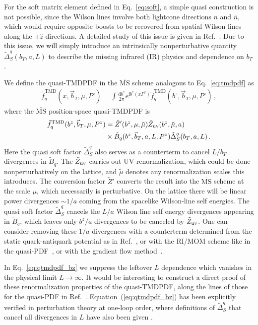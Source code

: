 \documentclass[prd,aps,twocolumn,bibnotes,nofootinbib,preprintnumbers,floatfix]{revtex4-1}
\DeclareRobustCommand{\eq}[1]{Eq.~\eqref{eq:#1}}
\DeclareRobustCommand{\mycite}[1]{Ref.~\cite{#1}}
\newcommand{\df}{\mathrm{d}}
\newcommand{\img}{\mathrm{i}}
\newcommand{\nn}{\nonumber}
\newcommand{\bn}{{\bar{n}}}
\newcommand{\bt}{\vec b_T}
\newcommand{\MS}{\overline{\mathrm{MS}}}
\newcommand\TMD{\mathrm{TMD}}
\begin{document}
For the soft matrix element defined in \eq{soft}, a simple quasi construction is not possible,
since the Wilson lines involve both lightcone directions $n$ and $\bn$, which would require opposite boosts to be recovered from spatial Wilson lines along the $\pm \hat z$ directions.
A detailed study of this issue is given in \mycite{Ebert:2019okf}.
Due to this issue, we will simply introduce an intrinsically nonperturbative quantity $\tilde\Delta_S^q(b_T,a,L)$ to describe the missing infrared (IR) physics and dependence on $b_T$.


We define the quasi-TMDPDF in the $\MS$ scheme analogous to \eq{tmdpdf} as
\begin{align} \label{eq:qtmdpdf}
 \tilde f_{q}^\TMD(x, \bt,\mu,P^z) = \!\int\!\frac{\df b^z}{2\pi} e^{\img b^z (x P^z)} \tilde f_{q}^\TMD(b^z, \bt,\mu,P^z)
\,, \end{align}
where the $\MS$ position-space quasi-TMDPDF is
\begin{align} \label{eq:qtmdpdf_bz}
 \tilde f^\TMD_q(b^z, \bt,  \mu, P^z)
 &= \tilde Z'(b^z,\mu,\tilde \mu) \tilde Z_{\rm uv}(b^z,\tilde \mu, a)
\\*& \times
 \tilde B_{q}(b^z, \bt, a, L, P^z) \tilde\Delta_S^q(b_T, a, L)
\nn\,.\end{align}
Here the quasi soft factor $\tilde\Delta_S^q$ also serves as a counterterm to cancel $L/b_T$ divergences in $\tilde B_{q}$.
The $\tilde Z_{\rm uv}$ carries out UV renormalization, which could be done nonperturbatively on the lattice, and $\tilde \mu$ denotes any renormalization scales this introduces. The conversion factor $\tilde Z'$ converts the result into the $\MS$ scheme at the scale $\mu$, which necessarily is perturbative. On the lattice there will be linear power divergences $\sim 1/a$ coming from the spacelike Wilson-line self energies. The quasi soft factor $\tilde\Delta_S^q$ cancels the $L/a$ Wilson line self energy divergences appearing in $\tilde B_{q}$, which leaves only $b^z/a$ divergences to be canceled by $\tilde Z_{\rm uv}$.
One can consider removing these $1/a$ divergences with a counterterm determined from the static quark-antiquark potential as in \mycite{Musch:2010ka}, or with the RI/MOM scheme like in the quasi-PDF~\cite{Constantinou:2017sej,Stewart:2017tvs}, or with the gradient flow method~\cite{Monahan:2016bvm}.


In \eq{qtmdpdf_bz} we suppress the leftover $L$ dependence which vanishes in the physical limit $L\to\infty$. It would be interesting to construct a direct proof of these renormalization properties of the quasi-TMDPDF, along the lines of those for the quasi-PDF in Ref.~\cite{Ji:2017oey,Ishikawa:2017faj}.  Equation~(\ref{eq:qtmdpdf_bz}) has been explicitly verified in perturbation theory at one-loop order, where definitions of $\tilde\Delta_S^q$ that cancel all divergences in $L$ have also been given \cite{Ji:2018hvs,Ebert:2019okf}.
\end{document}
